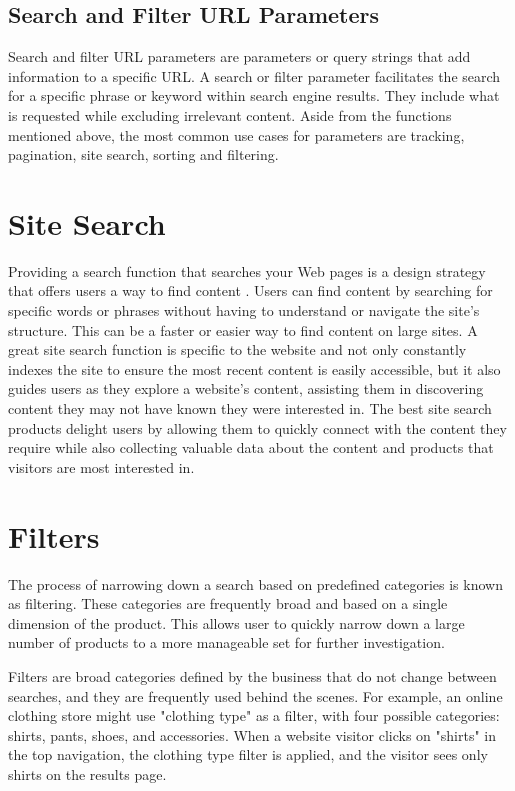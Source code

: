\subsection{Search and Filter URL Parameters}
Search and filter URL parameters are parameters or query strings that add information to a specific URL. A search or filter parameter facilitates the search for a specific phrase or keyword within search engine results. They include what is requested while excluding irrelevant content. Aside from the functions mentioned above, the most common use cases for parameters are tracking, pagination, site search, sorting and filtering.

\section{Site Search}
Providing a search function that searches your Web pages is a design strategy that offers users a way to find content \autocite{w3c2016search}. Users can find content by searching for specific words or phrases without having to understand or navigate the site's structure. This can be a faster or easier way to find content on large sites. A great site search function is specific to the website and not only constantly indexes the site to ensure the most recent content is easily accessible, but it also guides users as they explore a website's content, assisting them in discovering content they may not have known they were interested in. The best site search products delight users by allowing them to quickly connect with the content they require while also collecting valuable data about the content and products that visitors are most interested in.


\section{Filters}
The process of narrowing down a search based on predefined categories is known as filtering. These categories are frequently broad and based on a single dimension of the product. This allows user to quickly narrow down a large number of products to a more manageable set for further investigation.

Filters are broad categories defined by the business that do not change between searches, and they are frequently used behind the scenes. For example, an online clothing store might use "clothing type" as a filter, with four possible categories: shirts, pants, shoes, and accessories. When a website visitor clicks on "shirts" in the top navigation, the clothing type filter is applied, and the visitor sees only shirts on the results page.


